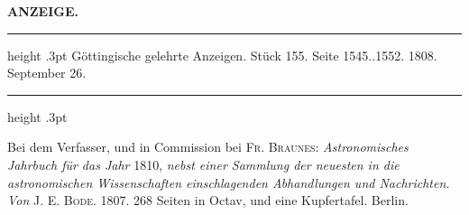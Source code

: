 \clearpage
\thispagestyle{empty}
\noindent{}%
%
\parbox[t]{\dimexpr\linewidth-24mm\relax}{\centering\footnotesize\bfseries ANZEIGE.\par}%
\makebox[12mm][r]{}\par\nobreak\medskip
\begin{center}
\parbox{.83\linewidth}{%
\centering\small
\hrule height .3pt\relax\vspace{2.5pt}
Göttingische gelehrte Anzeigen. Stück 155. Seite 1545..1552. 1808. September 26.\par
\vspace{2.5pt}\hrule height .3pt\relax
}
\end{center}

Bei dem Verfasser, und in Commission bei \textsc{Fr. Braunes}: \emph{Astronomisches Jahrbuch für das Jahr} 1810, \emph{nebst einer Sammlung der neuesten in die astronomischen Wissenschaften einschlagenden Abhandlungen und Nachrichten. Von} \textsc{J. E. Bode}. 1807. 268 Seiten in Octav, und eine Kupfertafel. Berlin.

